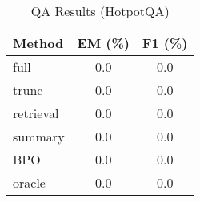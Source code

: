 \begin{table}[t]
\centering
\caption{QA Results (HotpotQA)}
\label{tab:qa}
\begin{tabular}{|l|c|c|}
\hline
\textbf{Method} & \textbf{EM (\%)} & \textbf{F1 (\%)} \\
\hline
full            & 0.0 & 0.0 \\
trunc           & 0.0 & 0.0 \\
retrieval       & 0.0 & 0.0 \\
summary         & 0.0 & 0.0 \\
BPO             & 0.0 & 0.0 \\
oracle          & 0.0 & 0.0 \\
\hline
\end{tabular}
\end{table}